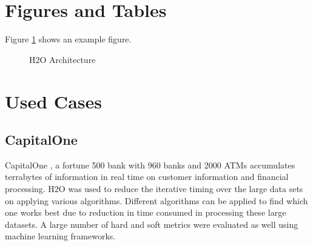 \documentclass[9pt,twocolumn,twoside]{styles/osajnl}
\begin{document}
\section{Figures and Tables}

Figure \ref{fig:Architecture of H2O} shows an example figure.

\begin{figure}[htbp]
\centering
{}
\caption{H2O Architecture}
\label{fig:Architecture of H2O}
\end{figure}


\section {Used Cases}

\subsection { CapitalOne}
\cite{www-h2o-capitalone}
CapitalOne , a fortune 500 bank with 960 banks and 2000 ATMs
accumulates terrabytes of information in real time on customer
information and financial processing. H2O was used to reduce the
iterative timing over the large data sets on applying various
algorithms. Different algorithms can be applied to find which one
works best due to reduction in time consumed in processing these large
datasets. A large number of hard and soft metrics were evaluated as
well using machine learning frameworks.
\end{document}

